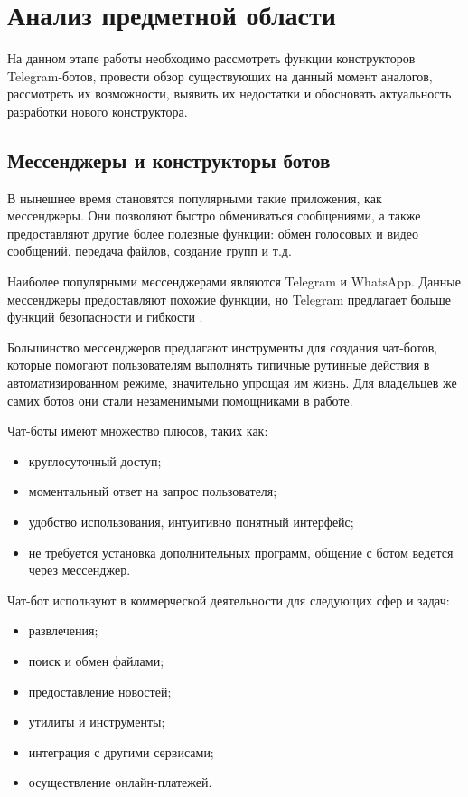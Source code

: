 
\section{Анализ предметной области}


На данном этапе работы необходимо рассмотреть функции
конструкторов Telegram-ботов,
провести обзор существующих на данный момент аналогов, рассмотреть их возможности,
выявить их
недостатки и обосновать актуальность разработки нового конструктора.

\subsection{Мессенджеры и конструкторы ботов}


В нынешнее время становятся популярными такие приложения, как мессенджеры.
Они позволяют быстро обмениваться сообщениями, а также предоставляют
другие более полезные функции:
обмен голосовых и видео сообщений, передача файлов, создание
групп и т.д.

Наиболее популярными мессенджерами являются Telegram и WhatsApp.
Данные мессенджеры предоставляют похожие функции, но Telegram предлагает больше
функций безопасности и гибкости .

Большинство мессенджеров предлагают инструменты для создания чат-ботов, которые помогают пользователям выполнять типичные рутинные действия в автоматизированном режиме,
значительно упрощая им жизнь. Для владельцев же самих ботов они стали
незаменимыми помощниками в работе.

Чат-боты имеют множество плюсов, таких как:
\begin{itemize}
	\item круглосуточный доступ;
	\item моментальный ответ на запрос пользователя;
	\item удобство использования, интуитивно понятный интерфейс;
	\item не требуется установка дополнительных программ,
	      общение с ботом ведется через мессенджер.
\end{itemize}

Чат-бот используют в коммерческой деятельности для следующих сфер и задач:
\begin{itemize}
	\item развлечения;
	\item поиск и обмен файлами;
	\item предоставление новостей;
	\item утилиты и инструменты;
	\item интеграция с другими сервисами;
	\item осуществление онлайн-платежей.
\end{itemize}


